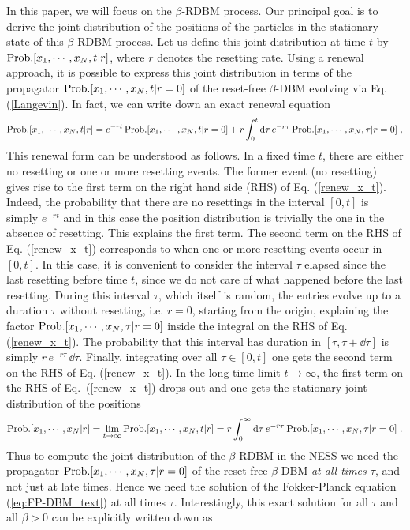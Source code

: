 \documentclass[onecolumn,superscriptaddress,
 amsmath,amssymb,
 aps,
 prd,
]{revtex4-1}
\newcommand{\bea}{\begin{eqnarray}}
\newcommand{\eea}{\end{eqnarray}}
\begin{document}
In this paper, we will focus on the $\beta$-RDBM process. Our principal goal is to derive the joint distribution of the positions of the particles in the stationary state of this $\beta$-RDBM process. Let us define this joint distribution at time $t$ by ${\rm Prob.}[x_1,\cdots, x_N,t \vert r]$, where $r$ denotes the resetting rate. Using a renewal approach, it is possible to express this joint distribution in terms of the propagator ${\rm Prob.}[x_1,\cdots, x_N,t \vert r=0]$ of the reset-free $\beta$-DBM evolving via Eq. (\ref{Langevin}). In fact, we can write down an exact renewal equation
\bea \label{renew_x_t}
{\rm Prob.}[x_1,\cdots, x_N,t \vert r] = e^{-rt}\, {\rm Prob.}[x_1,\cdots, x_N, t \vert r = 0] + r \int_0^t \dd \tau \, e^{-r \tau}\, {\rm Prob.}[x_1,\cdots, x_N, \tau \vert r = 0] \;, 
\eea
This renewal form can be understood as follows. In a fixed time $t$, there are either no resetting or one or more resetting events. The former event (no resetting) gives rise to the first term on the right hand side (RHS) of Eq. (\ref{renew_x_t}). Indeed, the probability that there are no resettings in the interval $[0,t]$ is simply $e^{-r t}$ and in this case the position distribution is trivially the one in the absence of resetting. This explains the first term. The second term on the RHS of Eq. (\ref{renew_x_t}) corresponds to when one or more resetting events occur in $[0,t]$. In this case, it is convenient to consider the interval $\tau$ elapsed since the last resetting before time $t$, since we do not care of what happened before the last resetting. During this interval $\tau$, which itself is random, the entries evolve up to a duration $\tau$ without resetting, i.e. $r=0$, starting from the origin, explaining the factor ${\rm Prob.}[x_1,\cdots, x_N, \tau \vert r = 0] $ inside the integral on the RHS of Eq. (\ref{renew_x_t}). The probability that this interval has duration in $[\tau, \tau + \dd\tau]$ is simply $r\,e^{-r\tau} \,\dd \tau$. Finally, integrating over all $\tau \in [0,t]$ one gets the second term on the RHS of Eq. (\ref{renew_x_t}). 
In the long time limit $t \to \infty$, the first term on the RHS of Eq.~(\ref{renew_x_t}) drops out and one gets the stationary joint distribution of the positions   
\bea \label{renew_x}
{\rm Prob.}[x_1,\cdots, x_N \vert r] =\lim_{t \to \infty}{\rm Prob.}[x_1,\cdots, x_N,t \vert r]= r \int_0^\infty \dd \tau \, e^{-r \tau}\, {\rm Prob.}[x_1,\cdots, x_N, \tau \vert r = 0] \;. 
\eea
Thus to compute the joint distribution of the $\beta$-RDBM in the NESS we need the propagator ${\rm Prob.}[x_1,\cdots, x_N, \tau \vert r = 0]$ of the reset-free $\beta$-DBM {\it at all times $\tau$}, and not just at late times. Hence we need the solution of the Fokker-Planck equation (\ref{eq:FP-DBM_text}) at all times $\tau$. Interestingly, this exact solution for all $\tau$ and all $\beta >0$ can be explicitly written down as
\end{document}
